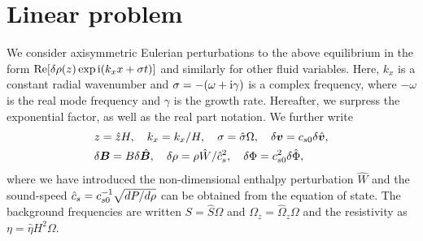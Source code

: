 \section{Linear problem}\label{linear}
We consider axisymmetric Eulerian perturbations to the above
equilibrium in the form $\operatorname{Re}[\delta\rho(z)\exp{\mathrm{i}(k_xx + \sigma
    t)}]$ and similarly for other fluid variables. Here, $k_x$ is a constant radial wavenumber and 
$\sigma=-(\omega +\mathrm{i}\gamma)$ is a complex 
frequency, where $-\omega$ is the real mode frequency and $\gamma$ is
the growth rate. Hereafter, we surpress the exponential factor, as
well as the real part notation.  We further write 
\begin{align}
  &z=\hat{z}H,\quad k_x =  k_x/H,\quad \sigma = \hat{\sigma}\Omega,
  \quad \delta\bm{v} = c_{s0} 
  \delta\hat{\bm{v}}, \\ 
  &\delta\bm{B} = B\delta\hat{\bm{B}},\quad
  \delta\rho = \rho\hat{W}/\hat{c}_s^2,\quad \delta\Phi =
  c_{s0}^2\delta\hat{\Phi}, 
\end{align}
where we have introduced the non-dimensional enthalpy perturbation
$\hat{W}$ and the sound-speed $\hat{c}_s=c_{s0}^{-1}\sqrt{dP/d\rho}$ can be 
obtained from the equation of state. The background frequencies are
written $S=\hat{S}\Omega$ and $\Omega_z=\hat{\Omega}_z\Omega$ and the 
resistivity as $\eta = \hat{\eta}H^2\Omega$. 

